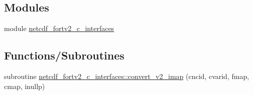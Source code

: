 \subsection*{Modules}
\begin{DoxyCompactItemize}
\item 
module \hyperlink{namespacenetcdf__fortv2__c__interfaces}{netcdf\+\_\+fortv2\+\_\+c\+\_\+interfaces}
\end{DoxyCompactItemize}
\subsection*{Functions/\+Subroutines}
\begin{DoxyCompactItemize}
\item 
subroutine \hyperlink{namespacenetcdf__fortv2__c__interfaces_aa498e7ff4a31dbaf7f7bebad93ca603c}{netcdf\+\_\+fortv2\+\_\+c\+\_\+interfaces\+::convert\+\_\+v2\+\_\+imap} (cncid, cvarid, fmap, cmap, inullp)
\end{DoxyCompactItemize}
